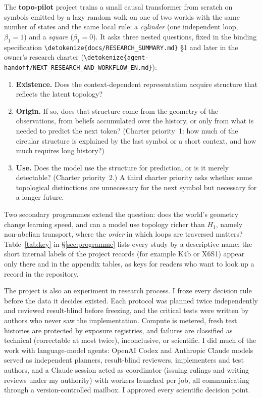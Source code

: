 \documentclass[11pt,a4paper]{article}
\DeclareRobustCommand{\_}{\ifmmode\origunderscore\else\textunderscore\allowbreak\fi}
\DeclareRobustCommand{\fpath}[1]{\begingroup\small\expandafter\nolinkurl\expandafter{\detokenize{#1}}\endgroup}
\begin{document}
The \textbf{topo-pilot} project trains a small causal transformer from scratch on symbols
emitted by a lazy random walk on one of two worlds with the same number of states and the same
local rule: a \emph{cylinder} (one independent loop, $\beta_1=1$) and a \emph{square}
($\beta_1=0$). It asks three nested questions, fixed in the binding specification
\fpath{docs/RESEARCH_SUMMARY.md} \S1 and later in the owner's research charter
(\fpath{agent-handoff/NEXT_RESEARCH_AND_WORKFLOW_EN.md}):
\begin{enumerate}[label=\textbf{RQ\arabic*}]
\item \textbf{Existence.} Does the context-dependent representation acquire structure that
reflects the latent topology?
\item \textbf{Origin.} If so, does that structure come from the geometry of the observations,
from beliefs accumulated over the history, or only from what is needed to predict the next
token? (Charter priority~1: how much of the circular structure is explained by the last
symbol or a short context, and how much requires long history?)
\item \textbf{Use.} Does the model use the structure for prediction, or is it merely detectable?
(Charter priority~2.) A third charter priority asks whether some topological distinctions
are unnecessary for the next symbol but necessary for a longer future.
\end{enumerate}
Two secondary programmes extend the question: does the world's geometry change learning speed,
and can a model use topology richer than $H_1$, namely non-abelian transport, where the
\emph{order} in which loops are traversed matters? Table~\ref{tab:key} in
\S\ref{sec:programme} lists every study by a descriptive name; the short internal labels of the
project records (for example K4b or X6S1) appear only there and in the appendix tables, as keys
for readers who want to look up a record in the repository.

The project is also an experiment in research process. I froze every decision rule before
the data it decides existed. Each protocol was planned twice independently and reviewed
result-blind before freezing, and the critical tests were written by authors who never saw the
implementation. Compute is metered, fresh test histories are protected by exposure registries,
and failures are classified as technical (correctable at most twice), inconclusive, or
scientific. I did much of the work with language-model agents: OpenAI Codex and Anthropic
Claude models served as independent planners, result-blind reviewers, implementers and test
authors, and a Claude session acted as coordinator (issuing rulings and writing reviews under my
authority) with workers launched per job, all communicating through a version-controlled
mailbox. I approved every scientific decision point.
\end{document}
